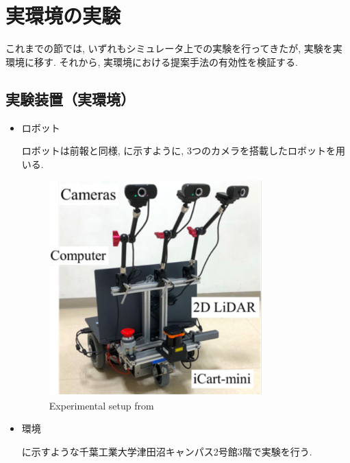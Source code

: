 
\section{実環境の実験}
これまでの節では, いずれもシミュレータ上での実験を行ってきたが, 実験を実環境に移す. それから, 実環境における提案手法の有効性を検証する.

\subsection{実験装置（実環境）}
\begin{itemize}
  \item ロボット
  
  ロボットは前報\cite{okada1}と同様, に示すように, 3つのカメラを搭載したロボットを用いる.

  \vspace{2cm}
  
  \begin{figure}[hbtp]
    \centering
   \includegraphics[keepaspectratio, scale=0.7]
        {images/gamma2.png}
   \caption{Experimental setup from \cite{okada1}}
   \label{Fig:gamma}
  \end{figure}

  \newpage

  \item 環境

  に示すような千葉工業大学津田沼キャンパス2号館3階で実験を行う.


\end{itemize}
